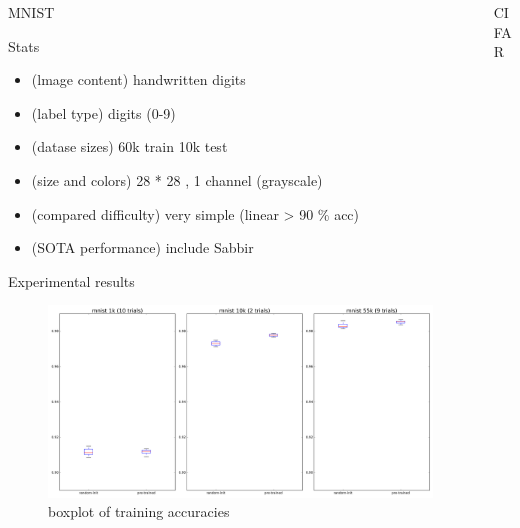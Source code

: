\documentclass[final]{beamer}
\newlength{\onecolwid}
\begin{document}
\begin{frame}[t]
\begin{columns}[t]
\begin{column}{\onecolwid}
\begin{block}{MNIST}
\end{block}

\begin{block}{Stats}
\begin{itemize}
\item (lmage content) handwritten digits 
\item (label type) digits (0-9)
\item (datase sizes) 60k train 10k test
\item (size and colors) 28 * 28 , 1 channel (grayscale)
\item (compared difficulty) very simple (linear > 90 \% acc)
\item (SOTA performance) include Sabbir

\end{itemize}
\end{block}

\begin{block}{Experimental results}

\begin{figure}
\includegraphics[width=\linewidth]{box_plots/boxplots_mnist.png}
\caption{boxplot of training accuracies}
\end{figure}

\end{block}


\end{column} %



\begin{column}{\onecolwid} 

\begin{block}{CIFAR}

\end{block}


\end{column}
\end{columns}
\end{frame}
\end{document}
